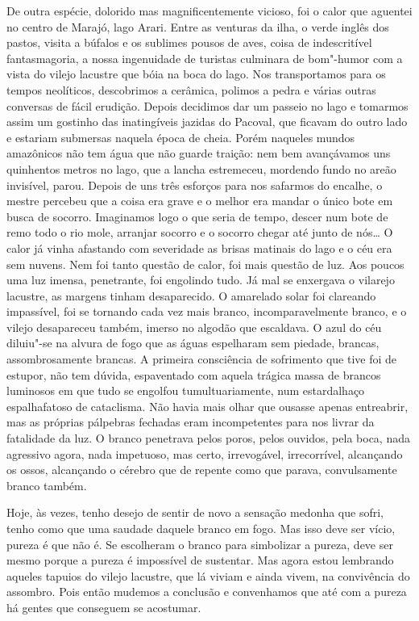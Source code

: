 De outra espécie, dolorido mas magnificentemente vicioso, foi o calor
que aguentei no centro de Marajó, lago Arari. Entre as venturas da ilha,
o verde inglês dos pastos, visita a búfalos e os sublimes pousos de
aves, coisa de indescritível fantasmagoria, a nossa ingenuidade de
turistas culminara de bom"-humor com a vista do vilejo lacustre que
bóia na boca do lago. Nos transportamos para os tempos neolíticos,
descobrimos a cerâmica, polimos a pedra e várias outras conversas de
fácil erudição. Depois decidimos dar um passeio no lago e tomarmos assim
um gostinho das inatingíveis jazidas do Pacoval, que ficavam do outro
lado e estariam submersas naquela época de cheia. Porém naqueles mundos
amazônicos não tem água que não guarde traição: nem bem avançávamos uns
quinhentos metros no lago, que a lancha estremeceu, mordendo fundo no
areão invisível, parou. Depois de uns três esforços para nos safarmos do
encalhe, o mestre percebeu que a coisa era grave e o melhor era mandar o
único bote em busca de socorro. Imaginamos logo o que seria de tempo,
descer num bote de remo todo o rio mole, arranjar socorro e o socorro
chegar até junto de nós\ldots{} O calor já vinha afastando com severidade as
brisas matinais do lago e o céu era sem nuvens. Nem foi tanto questão de
calor, foi mais questão de luz. Aos poucos uma luz imensa, penetrante,
foi engolindo tudo. Já mal se enxergava o vilarejo lacustre, as margens
tinham desaparecido. O amarelado solar foi clareando impassível, foi se
tornando cada vez mais branco, incomparavelmente branco, e o vilejo
desapareceu também, imerso no algodão que escaldava. O azul do céu
diluiu"-se na alvura de fogo que as águas espelharam sem piedade,
brancas, assombrosamente brancas. A primeira consciência de sofrimento
que tive foi de estupor, não tem dúvida, espaventado com aquela trágica
massa de brancos luminosos em que tudo se engolfou tumultuariamente, num
estardalhaço espalhafatoso de cataclisma. Não havia mais olhar que
ousasse apenas entreabrir, mas as próprias pálpebras fechadas eram
incompetentes para nos livrar da fatalidade da luz. O branco penetrava
pelos poros, pelos ouvidos, pela boca, nada agressivo agora, nada
impetuoso, mas certo, irrevogável, irrecorrível, alcançando os ossos,
alcançando o cérebro que de repente como que parava, convulsamente
branco também.

Hoje, às vezes, tenho desejo de sentir de novo a sensação medonha que
sofri, tenho como que uma saudade daquele branco em fogo. Mas isso deve
ser vício, pureza é que não é. Se escolheram o branco para simbolizar a
pureza, deve ser mesmo porque a pureza é impossível de sustentar. Mas
agora estou lembrando aqueles tapuios do vilejo lacustre, que lá viviam
e ainda vivem, na convivência do assombro. Pois então mudemos a
conclusão e convenhamos que até com a pureza há gentes que conseguem se
acostumar.

